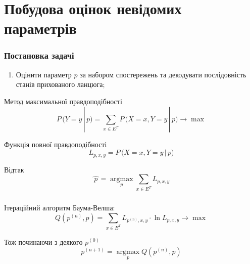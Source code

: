 \documentclass[12pt,mathserif]{beamer}
\DeclareMathOperator*{\argmax}{argmax}
\theoremstyle{plain}
\begin{document}
\section{Побудова оцінок невідомих параметрів}

\begin{frame}
    \frametitle{Постановка задачі}
    \begin{enumerate}[1]
        \item Оцінити параметр $p$ за набором спостережень та декодувати послідовність станів прихованого ланцюга;
    \end{enumerate}
    \vspace{0.5cm}

    \pause
    Метод максимальної правдоподібності
    \begin{equation*}
        P\, \bigl( Y=y \,|\, p \bigr) = \sum_{x \in E^T} P\, \bigl( X=x,Y=y \,|\, p \bigr) \longrightarrow \max
    \end{equation*}

    Функція повної правдоподібності
    \begin{equation*}
        L_{p,x,y} = P\, \bigl( X=x,Y=y \,|\, p \bigr)
    \end{equation*}

    Відтак
    \begin{equation*}
        \widehat{\,p\,} = \argmax\limits_{p} \sum_{x \in E^T} L_{p,x,y}
    \end{equation*}
\end{frame}

\begin{frame}
    \frametitle{\insertsection}

    Ітераційний алгоритм Баума-Велша: 
    \begin{equation*}
        Q\left( p^{(n)},p \right) = \sum_{x \in E^T}L_{p^{(n)},x,y}\cdot\ln L_{p,x,y} \longrightarrow \max
    \end{equation*}

    Тож починаючи з деякого $p^{(0)}$
    \begin{equation*}
        p^{(n+1)} = \argmax\limits_{p} Q\left( p^{(n)},p \right)
    \end{equation*}
\end{frame}
\end{document}
